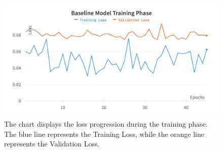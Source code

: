 \begin{figure}[H]
	\centering
	\includegraphics[width=.8\textwidth]{chapters/3_models/imgs/ufnc/ufnctraining.png}
	\caption{The chart displays the loss progression during the training phase. The blue line represents the Training Loss, while the orange line represents the Validation Loss.}
	\label{fig:ufcntraining}
\end{figure}

